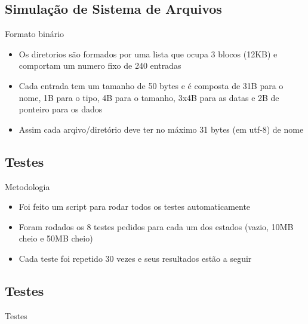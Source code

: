 \documentclass{beamer}
\begin{document}
\subsection{Simulação de Sistema de Arquivos}
\begin{frame}{Formato binário}
\begin{itemize}
\setlength\itemsep{1em}
\item Os diretorios são formados por uma lista que ocupa 3 blocos (12KB) e comportam um numero fixo de 240 entradas
\item Cada entrada tem um tamanho de 50 bytes e é composta de 31B para o nome, 1B para o tipo, 4B para o tamanho, 3x4B para as datas e 2B de ponteiro para os dados
\item Assim cada arqivo/diretório deve ter no máximo 31 bytes (em utf-8) de nome
\end{itemize}
\end{frame}

\subsection{Testes}
\begin{frame}{Metodologia}
\begin{itemize}
\setlength\itemsep{1em}
\item Foi feito um script para rodar todos os testes automaticamente
\item Foram rodados os 8 testes pedidos para cada um dos estados (vazio, 10MB cheio e 50MB cheio)
\item Cada teste foi repetido 30 vezes e seus resultados estão a seguir
\end{itemize}
\end{frame}


\subsection{Testes}
\begin{frame}{Testes}
\begin{table}[]
\centering
\label{my-label}
\end{table}
\end{frame}
\end{document}
